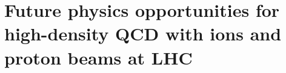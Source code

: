 \documentclass[../report.tex]{subfiles}
\begin{document}
\section{Future physics opportunities for high-density QCD with ions and proton beams at LHC}
\end{document}
